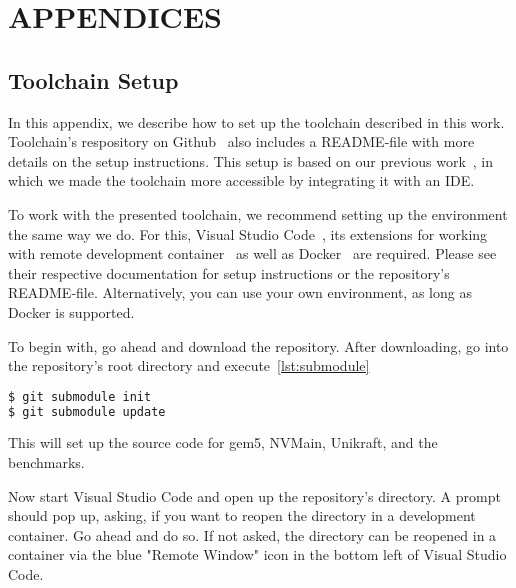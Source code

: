 \section*{APPENDICES}\label{sec:appendices}
\subsection*{Toolchain Setup}
\label{app:setup}
In this appendix, we describe how to set up the toolchain described in this work. Toolchain's respository on Github~\cite{repo} also includes a README-file with more details on the setup instructions. This setup is based on our previous work~\cite{hoelscher:2023}, in which we made the toolchain more accessible by integrating it with an IDE.

To work with the presented toolchain, we recommend setting up the environment
the same way we do. For this, Visual Studio Code~\cite{vscode}, its extensions for working with remote
development container~\cite{vscodeextensions} as well as Docker~\cite{docker} are required. Please see their respective documentation for setup instructions or the repository's README-file. Alternatively, you can use your own environment, as long as Docker is supported.

To begin with, go ahead and download the repository. After downloading, go into the repository's root directory and execute~\cref{lst:submodule}
\begin{lstlisting}[caption={Submodule initialization},label=lst:submodule,language=bash]
$ git submodule init
$ git submodule update
\end{lstlisting}
This will set up the source code for gem5, NVMain, Unikraft, and the benchmarks.

Now start Visual Studio Code and open up the repository's directory. A prompt should pop up,
asking, if you want to reopen the directory in a development container. Go ahead and do so. If not asked, the directory can be reopened in a container via the blue "Remote Window" icon in the bottom left of
Visual Studio Code.


